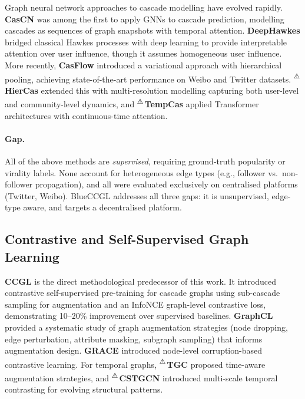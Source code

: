 \documentclass[12pt,a4paper]{article}
\newcommand{\flagcite}[1]{%
  {\color{orange}\textsuperscript{⚠}}\,#1%
}
\begin{document}
Graph neural network approaches to cascade modelling have evolved rapidly.
\textbf{CasCN} \citep{chen2019cascn} was among the first to apply GNNs to
cascade prediction, modelling cascades as sequences of graph snapshots with
temporal attention.  \textbf{DeepHawkes} \citep{cao2017deephawkes} bridged
classical Hawkes processes with deep learning to provide interpretable
attention over user influence, though it assumes homogeneous user influence.
More recently, \textbf{CasFlow} \citep{yuan2024casflow} introduced a
variational approach with hierarchical pooling, achieving state-of-the-art
performance on Weibo and Twitter datasets.
\flagcite{\textbf{HierCas} \citep{wang2024hiercas}} extended this with
multi-resolution modelling capturing both user-level and community-level
dynamics, and \flagcite{\textbf{TempCas} \citep{liu2025tempcas}} applied
Transformer architectures with continuous-time attention.

\paragraph{Gap.}
All of the above methods are \emph{supervised}, requiring ground-truth
popularity or virality labels.  None account for heterogeneous edge types
(e.g., follower vs.\ non-follower propagation), and all were evaluated
exclusively on centralised platforms (Twitter, Weibo).  BlueCCGL addresses
all three gaps: it is unsupervised, edge-type aware, and targets a
decentralised platform.

\subsection{Contrastive and Self-Supervised Graph Learning}

\textbf{CCGL} \citep{xu2022ccgl} is the direct methodological predecessor of
this work.  It introduced contrastive self-supervised pre-training for cascade
graphs using sub-cascade sampling for augmentation and an InfoNCE
graph-level contrastive loss, demonstrating 10--20\% improvement over
supervised baselines.  \textbf{GraphCL} \citep{you2020graphcl} provided a
systematic study of graph augmentation strategies (node dropping, edge
perturbation, attribute masking, subgraph sampling) that informs augmentation
design.  \textbf{GRACE} \citep{zhu2020grace} introduced node-level
corruption-based contrastive learning.  For temporal graphs,
\flagcite{\textbf{TGC} \citep{zhang2023tgc}} proposed time-aware augmentation
strategies, and \flagcite{\textbf{CSTGCN} \citep{li2024cstgcn}} introduced
multi-scale temporal contrasting for evolving structural patterns.
\end{document}
